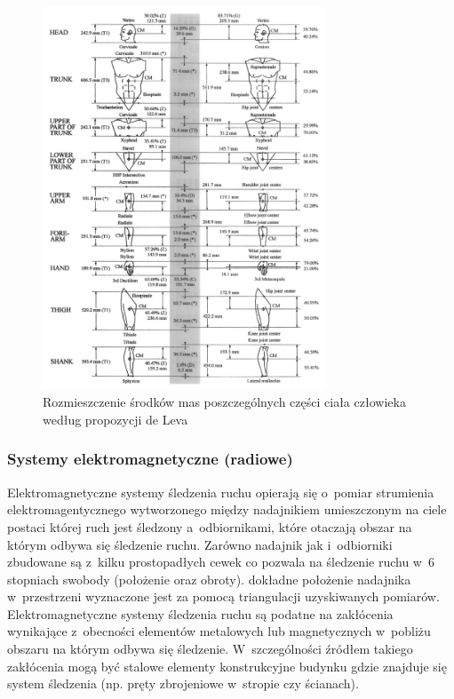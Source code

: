\begin{figure}[!htp]
	\centering	
	\includegraphics[width=0.75\textwidth]{images/centerOfMass.png}
	\caption{Rozmieszczenie środków mas poszczególnych części ciała człowieka według propozycji de Leva\cite{DeLeva1996}}	
	\label{fig:centerOfMass}	
\end{figure}

\subsubsection*{Systemy elektromagnetyczne (radiowe)}
Elektromagnetyczne systemy śledzenia ruchu opierają się o~pomiar strumienia elektromagentycznego wytworzonego między nadajnikiem umieszczonym na ciele postaci której ruch jest śledzony a~odbiornikami, które otaczają obszar na którym odbywa się śledzenie ruchu. Zarówno nadajnik jak i~odbiorniki zbudowane są z~kilku prostopadłych cewek co pozwala na śledzenie ruchu w~6 stopniach swobody (położenie oraz obroty). dokładne położenie nadajnika w~przestrzeni wyznaczone jest za pomocą triangulacji uzyskiwanych pomiarów. Elektromagnetyczne systemy śledzenia ruchu są podatne na zakłócenia wynikające z~obecności elementów metalowych lub magnetycznych w~pobliżu obszaru na którym odbywa się śledzenie. W~szczególności źródłem  takiego zakłócenia mogą być stalowe elementy konstrukcyjne budynku gdzie znajduje się system śledzenia (np. pręty zbrojeniowe w~stropie czy ścianach). 

